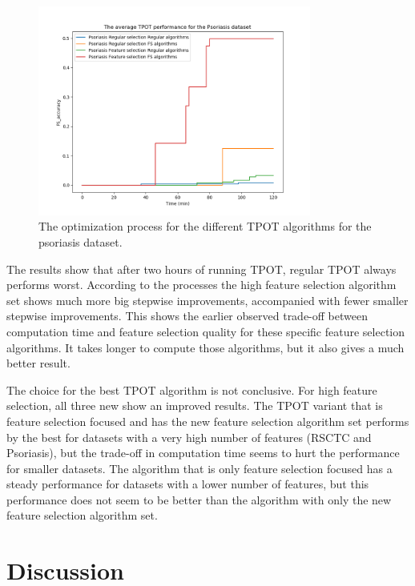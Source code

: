 \documentclass[10pt,a4paper]{report}
\begin{document}
	\begin{figure}[H]
		\centering
		\includegraphics[width=0.8\textwidth]{TPOT_avg_Psoriasis.PNG}
		\caption{The optimization process for the different TPOT algorithms for the psoriasis dataset.}
		\label{fig:TPOTResultPsoriasis}
	\end{figure}
	
	The results show that after two hours of running TPOT, regular TPOT always performs worst. According to the processes the high feature selection algorithm set shows much more big stepwise improvements, accompanied with fewer smaller stepwise improvements. This shows the earlier observed trade-off between computation time and feature selection quality for these specific feature selection algorithms. It takes longer to compute those algorithms, but it also gives a much better result. 
	
	The choice for the best TPOT algorithm is not conclusive. For high feature selection, all three new show an improved results. The TPOT variant that is feature selection focused and has the new feature selection algorithm set performs by the best for datasets with a very high number of features (RSCTC and Psoriasis), but the trade-off in computation time seems to hurt the performance for smaller datasets. The algorithm that is only feature selection focused has a steady performance for datasets with a lower number of features, but this performance does not seem to be better than the algorithm with only the new feature selection algorithm set.
	
	\newpage
	\section{Discussion}
	\label{FSsec:Discussion}
	
\end{document}
